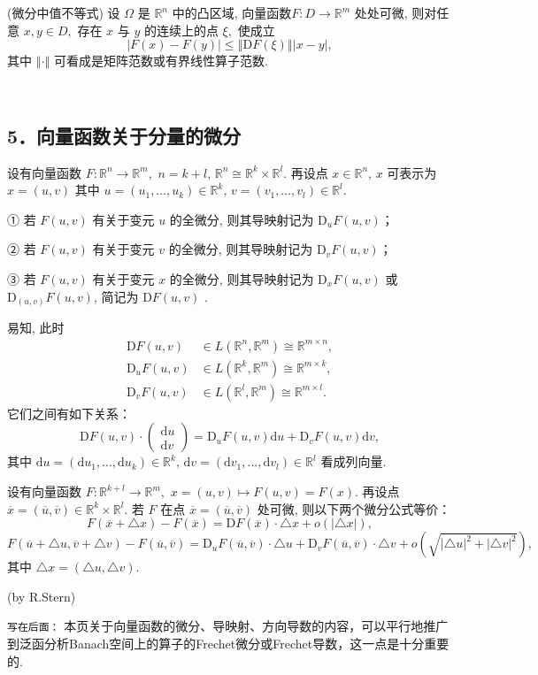 \begin{theorem}{(微分中值不等式)}
设 $\Omega$ 是 $\mathbb{R}^{n}$ 中的凸区域, 向量函数$F:D\rightarrow\mathbb{R}^{m}$
处处可微, 则对任意 $x,y\in D,$ 存在 $x$ 与 $y$ 的连续上的点 $\xi,$ 使成立
\[
|F(x)-F(y)|\leqslant\left\Vert \mathrm{D}F(\xi)\right\Vert |x-y|,
\]
其中 $\left\Vert \cdot\right\Vert $ 可看成是矩阵范数或有界线性算子范数. 
\end{theorem}
\verb| |

\subsection{5．向量函数关于分量的微分}
设有向量函数 $F:\mathbb{R}^{n}\rightarrow\mathbb{R}^{m},$ $n=k+l$, $\mathbb{R}^{n}\cong\mathbb{R}^{k}\times\mathbb{R}^{l}$.
再设点 $x\in\mathbb{R}^{n}$, $x$ 可表示为 $x=(u,v)$ 其中 $u=(u_{1},\ldots,u_{k})\in\mathbb{R}^{k}$,
$v=(v_{1},\ldots,v_{l})\in\mathbb{R}^{l}.$ 

① 若 $F(u,v)$ 有关于变元 $u$ 的全微分, 则其导映射记为 $\mathrm{D}_{u}F(u,v)$；

② 若 $F(u,v)$ 有关于变元 $v$ 的全微分, 则其导映射记为 $\mathrm{D}_{v}F(u,v)$；

③ 若 $F(u,v)$ 有关于变元 $x$ 的全微分, 则其导映射记为 $\mathrm{D}_{x}F(u,v)$ 或 $\mathrm{D}_{(u,v)}F(u,v)$,
简记为 $\mathrm{D}F(u,v)$ . 

易知, 此时 
$$
\begin{aligned}
\mathrm{D}F(u,v) & \in L(\mathbb{R}^{n},\mathbb{R}^{m})\cong\mathbb{R}^{m\times n},\\
\mathrm{D}_{u}F(u,v) & \in L(\mathbb{R}^{k},\mathbb{R}^{m})\cong\mathbb{R}^{m\times k},\\
\mathrm{D}_{v}F(u,v) & \in L(\mathbb{R}^{l},\mathbb{R}^{m})\cong\mathbb{R}^{m\times l}.
\end{aligned}
$$
它们之间有如下关系：
$$
\mathrm{D}F(u,v)\cdot\left(\begin{array}{c}
\mathrm{d}u\\
\mathrm{d}v
\end{array}\right)=\mathrm{D}_{u}F(u,v)\mathrm{d}u+\mathrm{D}_{v}F(u,v)\mathrm{d}v,
$$
其中 $\mathrm{d}u=(\mathrm{d}u_{1},\ldots,\mathrm{d}u_{k})\in\mathbb{R}^{k}$,
$\mathrm{d}v=(\mathrm{d}v_{1},\ldots,\mathrm{d}v_{l})\in\mathbb{R}^{l}$
看成列向量. 

设有向量函数 $F:\mathbb{R}^{k+l}\rightarrow\mathbb{R}^{m},$ $x=(u,v)\mapsto F(u,v)=F(x)$.
再设点 $\overline{x}=(\overline{u},\overline{v})\in\mathbb{R}^{k}\times\mathbb{R}^{l}.$
若 $F$ 在点 $\overline{x}=(\overline{u},\overline{v})$ 处可微, 则以下两个微分公式等价：
\[
F(\overline{x}+\triangle x)-F(\overline{x})=\mathrm{D}F(\overline{x})\cdot\triangle x+o(|\triangle x|),
\]
\[
F(\overline{u}+\triangle u,\overline{v}+\triangle v)-F(\overline{u},\overline{v})=\mathrm{D}_{u}F(\overline{u},\overline{v})\cdot\triangle u+\mathrm{D}_{v}F(\overline{u},\overline{v})\cdot\triangle v+o(\sqrt{|\triangle u|^{2}+|\triangle v|^{2}}),
\]
其中 $\triangle x=(\triangle u,\triangle v)$.

(by R.Stern)


\verb|写在后面：| 本页关于向量函数的微分、导映射、方向导数的内容，可以平行地推广到泛函分析Banach空间上的算子的Frechet微分或Frechet导数，这一点是十分重要的.